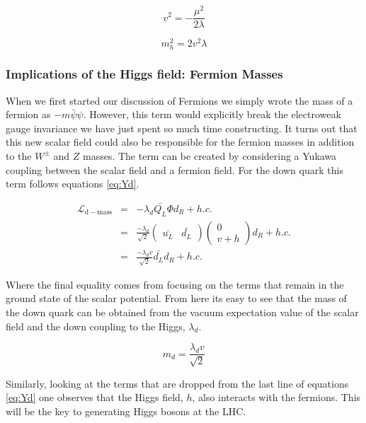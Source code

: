 \begin{equation}
\label{eq:VeV}
v^{2} = -\frac{\mu^2}{2\lambda}
\end{equation}

\begin{equation}
\label{eq:Hmass}
m_{h}^{2} = 2v^{2}\lambda
\end{equation}

\subsubsection{Implications of the Higgs field: Fermion Masses}
\label{sec:FermionMasses}

When we first started our discussion of Fermions we simply wrote the mass of a fermion as $-m\bar{\psi}\psi$. However, this term would explicitly break the electroweak gauge invariance we have just spent so much time constructing. It turns out that this new scalar field could also be responsible for the fermion masses in addition to the $W^{\pm}$ and $Z$ masses. The term can be created by considering a Yukawa coupling between the scalar field and a fermion field. For the down quark this term follows equations \ref{eq:Yd}.

\begin{eqnarray}
\label{eq:Yd}
\mathcal{L}_{\mathrm{d-mass}} &=& -\lambda_{d}\bar{Q_{L}}\Phi d_{R} + h.c. \nonumber \\
 &=& \frac{-\lambda_{d}}{\sqrt{2}}\begin{pmatrix}\bar{u_{L}}& \bar{d_{L}}\end{pmatrix}\begin{pmatrix} 0 \\ v + h \end{pmatrix} d_{R} + h.c. \\
  &=& \frac{-\lambda_{d}v}{\sqrt{2}}\bar{d_{L}}d_{R} + h.c. \nonumber
\end{eqnarray}

Where the final equality comes from focusing on the terms that remain in the ground state of the scalar potential. From here its easy to see that the mass of the down quark can be obtained from the vacuum expectation value of the scalar field and the down coupling to the Higgs, $\lambda_{d}$.

\begin{equation}
\label{eq:Md}
m_{d} = \frac{\lambda_{d}v}{\sqrt{2}}
\end{equation}

Similarly, looking at the terms that are dropped from the last line of equations \ref{eq:Yd} one observes that the Higgs field, $h$, also interacts with the fermions. This will be the key to generating Higgs bosons at the LHC.

